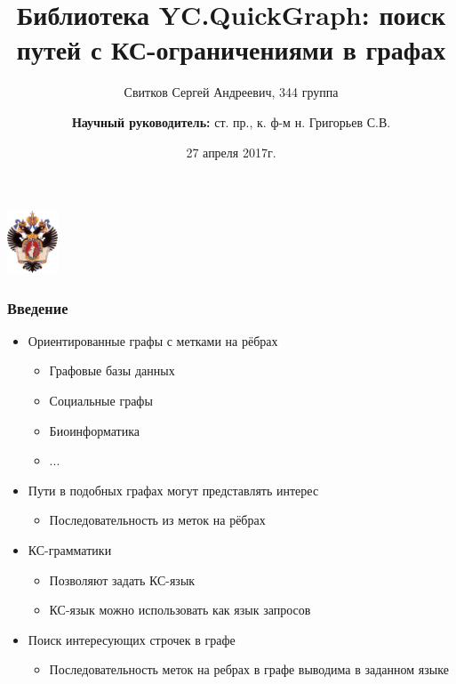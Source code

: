 \documentclass{beamer}
\title[]{Библиотека YC.QuickGraph: поиск путей с КС-ограничениями в графах}
\institute[СПбГУ]{
Санкт-Петербургский государственный университет \\
Кафедра системного программирования }
\author[Свитков Сергей]{Свитков Сергей Андреевич, 344 группа \\
  \and  
    {\bfseries Научный руководитель:} ст. пр., к. ф-м н. Григорьев С.В. \\ }
\date{27 апреля 2017г.}
\begin{document}
{
\begin{frame}
  \begin{center}
  {\includegraphics[width=1.5cm]{pictures/SPbGU_Logo.png}}
  \end{center}
  \titlepage
\end{frame}
}

\begin{frame}[fragile]
  \transwipe[direction=90]
  \frametitle{Введение}
  \begin{itemize}
    \item Ориентированные графы с метками на рёбрах
    \begin{itemize}
        \item Графовые базы данных
        \item Социальные графы
        \item Биоинформатика
        \item ...
    \end{itemize}
    \item Пути в подобных графах могут представлять интерес
    \begin{itemize}
        \item Последовательность из меток на рёбрах
    \end{itemize}
    \item КС-грамматики
    \begin{itemize}
        \item Позволяют задать КС-язык
        \item КС-язык можно использовать как язык запросов
    \end{itemize}
    \item Поиск интересующих строчек в графе
    \begin{itemize}
        \item Последовательность меток на ребрах в графе выводима в заданном языке
    \end{itemize}
  \end{itemize}
\end{frame}
            
\end{document}
